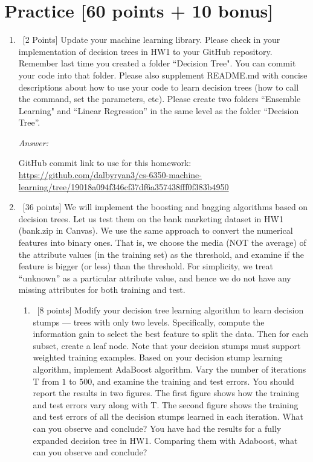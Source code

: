 \documentclass[12pt, fullpage,letterpaper]{article}
\begin{document}
\section{Practice [60 points + 10 bonus]}
\begin{enumerate}
	\item~[2 Points] Update your machine learning library. Please check in your implementation of decision trees in HW1 to your GitHub repository. Remember last time you created a folder ``Decision Tree". You can commit your code into that folder. Please also supplement README.md with concise descriptions about how to use your code to learn decision trees (how to call the command, set the parameters, etc). Please create two folders ``Ensemble Learning" and ``Linear Regression''  in the same level as the folder ``Decision Tree''.  

	\textit{Answer:}

	GitHub commit link to use for this homework: \url{https://github.com/dalbyryan3/cs-6350-machine-learning/tree/19018a094f346cf37df6a357438fff0f383b4950} 
	

\item~[36 points] We will implement the boosting and bagging algorithms based on decision trees.  Let us test them on the bank marketing dataset in HW1 (bank.zip in Canvas). We use the same approach to convert the numerical features into binary ones. That is, we choose the media (NOT the average) of the attribute values (in the training set) as the threshold, and examine if the feature is bigger (or less) than the threshold.  For simplicity, we treat ``unknown'' as a particular attribute value, and hence we do not have any missing attributes for both training and test.
\begin{enumerate}
	\item~[8 points] Modify your decision tree learning algorithm to learn decision stumps ---  trees with only two levels. Specifically, compute the information gain to select the best feature to split the data. Then for each subset, create a leaf node. Note that your decision stumps must support weighted training examples. Based on your decision stump learning algorithm, implement AdaBoost algorithm. Vary the number of iterations T from $1$ to $500$, and examine the training and test errors. You should report the results in two figures. The first figure shows how the training and test errors vary along with T. The second figure shows  the training and test errors of all the decision stumps learned in each iteration. What can you observe and conclude? You have had the results for a fully expanded decision tree in HW1. Comparing them with Adaboost, what can you observe and conclude?


\end{enumerate}
\end{enumerate}
\end{document}

